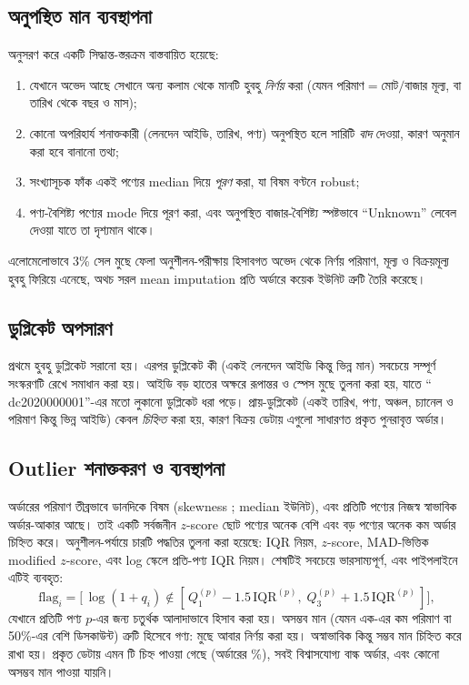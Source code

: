 \subsection{অনুপস্থিত মান ব্যবস্থাপনা}
\citet{garcia2015} অনুসরণ করে একটি সিদ্ধান্ত-স্তরক্রম বাস্তবায়িত হয়েছে:
\begin{enumerate}
  \item যেখানে অভেদ আছে সেখানে অন্য কলাম থেকে মানটি হুবহু \emph{নির্ণয়} করা (যেমন
        $\text{পরিমাণ} = \text{মোট}/\text{বাজার মূল্য}$, বা তারিখ থেকে বছর ও মাস);
  \item কোনো অপরিহার্য শনাক্তকারী (লেনদেন আইডি, তারিখ, পণ্য) অনুপস্থিত হলে সারিটি \emph{বাদ} দেওয়া, কারণ অনুমান করা হবে বানানো তথ্য;
  \item সংখ্যাসূচক ফাঁক একই পণ্যের median দিয়ে \emph{পূরণ} করা, যা বিষম বণ্টনে robust;
  \item পণ্য-বৈশিষ্ট্য পণ্যের mode দিয়ে পূরণ করা, এবং অনুপস্থিত বাজার-বৈশিষ্ট্য স্পষ্টভাবে ``Unknown'' লেবেল দেওয়া যাতে তা দৃশ্যমান থাকে।
\end{enumerate}
এলোমেলোভাবে 3\% সেল মুছে ফেলা অনুশীলন-পরীক্ষায় হিসাবগত অভেদ থেকে নির্ণয় পরিমাণ, মূল্য ও বিক্রয়মূল্য হুবহু ফিরিয়ে এনেছে, অথচ সরল
mean imputation প্রতি অর্ডারে কয়েক ইউনিট ত্রুটি তৈরি করেছে।

\subsection{ডুপ্লিকেট অপসারণ}
প্রথমে হুবহু ডুপ্লিকেট সরানো হয়। এরপর ডুপ্লিকেট কী (একই লেনদেন আইডি কিন্তু ভিন্ন মান) সবচেয়ে সম্পূর্ণ সংস্করণটি রেখে সমাধান করা
হয়। আইডি বড় হাতের অক্ষরে রূপান্তর ও স্পেস মুছে তুলনা করা হয়, যাতে `` dc2020000001''-এর মতো লুকানো ডুপ্লিকেট ধরা পড়ে।
প্রায়-ডুপ্লিকেট (একই তারিখ, পণ্য, অঞ্চল, চ্যানেল ও পরিমাণ কিন্তু ভিন্ন আইডি) কেবল \emph{চিহ্নিত} করা হয়, কারণ বিক্রয় ডেটায় এগুলো
সাধারণত প্রকৃত পুনরাবৃত্ত অর্ডার।

\subsection{Outlier শনাক্তকরণ ও ব্যবস্থাপনা}
অর্ডারের পরিমাণ তীব্রভাবে ডানদিকে বিষম (skewness \QtySkew; median \QtyMedian ইউনিট), এবং প্রতিটি পণ্যের নিজস্ব স্বাভাবিক অর্ডার-আকার
আছে। তাই একটি সর্বজনীন $z$-score ছোট পণ্যের অনেক বেশি এবং বড় পণ্যের অনেক কম অর্ডার চিহ্নিত করে। অনুশীলন-পর্যায়ে চারটি পদ্ধতির
তুলনা করা হয়েছে: IQR নিয়ম, $z$-score, MAD-ভিত্তিক modified $z$-score, এবং log স্কেলে প্রতি-পণ্য IQR নিয়ম। শেষটিই সবচেয়ে
ভারসাম্যপূর্ণ, এবং পাইপলাইনে এটিই ব্যবহৃত:
\[
  \text{flag}_i = \bigl[\, \log(1+q_i) \notin [\,Q_1^{(p)} - 1.5\,\text{IQR}^{(p)},\; Q_3^{(p)} + 1.5\,\text{IQR}^{(p)}\,] \bigr],
\]
যেখানে প্রতিটি পণ্য $p$-এর জন্য চতুর্থক আলাদাভাবে হিসাব করা হয়। অসম্ভব মান (যেমন এক-এর কম পরিমাণ বা 50\%-এর বেশি ডিসকাউন্ট)
ত্রুটি হিসেবে গণ্য: মুছে আবার নির্ণয় করা হয়। অস্বাভাবিক কিন্তু সম্ভব মান চিহ্নিত করে রাখা হয়। প্রকৃত ডেটায় এমন \NOutlierFlags টি
চিহ্ন পাওয়া গেছে (অর্ডারের \OutlierPct\%), সবই বিশ্বাসযোগ্য বাল্ক অর্ডার, এবং কোনো অসম্ভব মান পাওয়া যায়নি।


